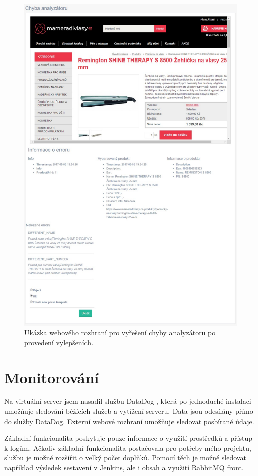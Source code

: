 \documentclass[thesis=B,czech]{FITthesis}[2012/06/26]
\begin{document}
\begin{figure}\centering
 	\includegraphics[width=1.0\textwidth]{resources/analyser-err}
	\caption[Webové rozhraní pro vyřešení chyby analyzátoru po provedení vylepšeních]{Ukázka webového rozhraní pro vyřešení chyby analyzátoru po provedení vylepšeních.}\label{fig:analyser-error}
\end{figure}

\section{Monitorování}
Na virtuální server jsem nasadil službu DataDog \cite{dataDog}, která po jednoduché instalaci umožňuje sledování běžících služeb
a vytížení serveru. Data jsou odesílány přímo do služby DataDog. Externí webové rozhraní umožňuje sledovat posbírané údaje.
\par
Základní funkcionalita poskytuje pouze informace o využití prostředků a přístup k logům. Ačkoliv základní funkcionalita postačovala pro potřeby 
mého projektu, službu je možné rozšířit o velký počet doplňků. Pomocí těch je možné sledovat například výsledek sestavení v Jenkins, ale i obsah a využití RabbitMQ front. 
\end{document}
